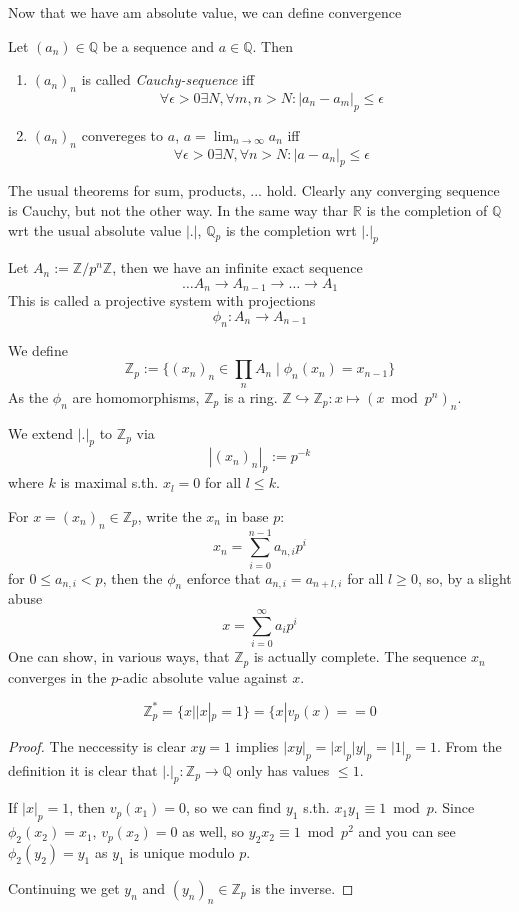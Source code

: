 Now that we have am absolute value, we can define convergence
\begin{definition}
  Let $(a_n)\in \mathbb Q$ be a sequence and $a\in \mathbb Q$. Then
  \begin{enumerate}
     \item $(a_n)_n$ is called {\em Cauchy-sequence} iff
       $$\forall \epsilon >0 \exists N, \forall m,n>N: |a_n-a_m|_p\le \epsilon$$
     \item $(a_n)_n$ convereges to $a$, $a = \lim_{n\to\infty} a_n$ iff
       $$\forall \epsilon>0\exists N, \forall n>N: |a-a_n|_p\le \epsilon$$
  \end{enumerate}
\end{definition}
The usual theorems for sum, products, ... hold. Clearly
any converging sequence is Cauchy, but not the other way.
In the same way thar $\mathbb R$ is the completion of $\mathbb Q$ wrt the usual
absolute value $|.|$, $\mathbb Q_p$ is the completion wrt $|.|_p$

\begin{definition}
  Let $A_n := \mathbb Z/p^n\mathbb Z$, then we have an infinite
  exact sequence
  $$\ldots A_n \to A_{n-1} \to \ldots \to A_1$$
  This is called a projective system with projections 
  $$\phi_n:A_n \to A_{n-1}$$

  We define 
  $$\mathbb Z_p := \{ (x_n)_n \in \prod_n A_n \mid \phi_n(x_n) = x_{n-1}\}$$
  As the $\phi_n$ are homomorphisms, $\mathbb Z_p$ is a ring.
  $\mathbb Z \hookrightarrow \mathbb Z_p: x \mapsto (x \bmod p^n)_n$.

  We extend $|.|_p$ to $\mathbb Z_p$ via
  $$|(x_n)_n|_p := p^{-k}$$
  where $k$ is maximal s.th. $x_l = 0$ for all $l\le k$.
\end{definition}

For $x = (x_n)_n\in \mathbb Z_p$, write the $x_n$ in base $p$:
$$x_n = \sum_{i=0}^{n-1} a_{n,i} p^i $$
for $0\le a_{n,i}<p$, then the $\phi_n$ enforce that
$a_{n, i} = a_{n+l, i}$ for all $l\ge 0$, so, by a slight abuse
$$x = \sum_{i=0}^\infty a_i p^i$$
One can show, in various ways, that $\mathbb Z_p$ is actually complete.
The sequence $x_n$ converges in the $p$-adic absolute value against $x$.

\begin{lemma}
  $$\mathbb Z_p^* = \{x | |x|_p = 1\} = \{x | v_p(x) == 0$$
\end{lemma}
\begin{proof}
  The neccessity is clear $xy = 1$ implies $|xy|_p = |x|_p |y|_p = |1|_p = 1$.
  From the definition it is clear that $|.|_p:\mathbb Z_p \to \mathbb Q$ 
  only has values $\le 1$.

  If $|x|_p = 1$, then $v_p(x_1) = 0$, so we can find $y_1$ s.th.
  $x_1y_1 \equiv 1 \bmod p$. Since $\phi_2(x_2) = x_1$, $v_p(x_2) = 0$ as well,
  so $y_2x_2 \equiv 1\bmod p^2$ and you can see $\phi_2(y_2) = y_1$ as $y_1$ is
  unique modulo $p$.

  Continuing we get $y_n$ and $(y_n)_n\in \mathbb Z_p$ is the inverse.
\end{proof}

